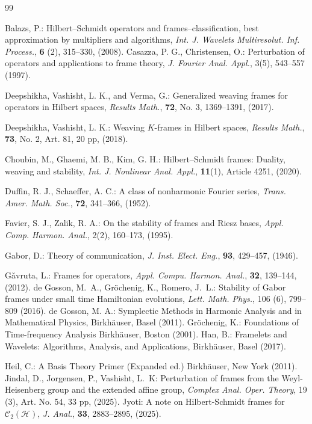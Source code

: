 \documentclass[reqno]{amsart}
\theoremstyle{plain}
\theoremstyle{remark}
\numberwithin{equation}{section}
\begin{document}
\begin{thebibliography}{99}\baselineskip10pt

Balazs, P.: Hilbert--Schmidt operators and frames--classification, best approximation by multipliers and algorithms,\emph{ Int. J. Wavelets Multiresolut. Inf. Process.}, \textbf{6} (2),  315--330, (2008).
Casazza, P. G.,  Christensen, O.: Perturbation of operators and applications to frame theory,  \emph{J. Fourier Anal. Appl.},  3(5),  543--557 (1997).


Deepshikha,  Vashisht, L. K., and Verma, G.:  Generalized weaving frames for  operators in Hilbert spaces, \emph{ Results  Math.}, \textbf{72}, No. 3,  1369--1391,  (2017).

Deepshikha, Vashisht, L. K.:  Weaving $K$-frames in Hilbert spaces, \emph{Results Math.},  \textbf{73},  No. 2, Art. 81, 20 pp, (2018).

Choubin, M., Ghaemi, M. B.,   Kim,  G. H.:  Hilbert--Schmidt frames: Duality, weaving and stability, \emph{Int. J. Nonlinear Anal.  Appl.},  \textbf{11}(1), Article 4251, (2020).

Duffin,  R. J.,  Schaeffer, A. C.: A class of nonharmonic Fourier series,  \emph{Trans. Amer. Math. Soc.}, \textbf{72}, 341--366,  (1952).


Favier, S. J.,  Zalik, R. A.: On the stability of frames and Riesz bases, \emph{Appl. Comp. Harmon. Anal.},   2(2),  160--173, (1995).

Gabor, D.: Theory of communication, \emph{ J. Inst. Elect. Eng.}, \textbf{93}, 429--457, (1946).


 G\v{a}vruta, L.:  Frames for operators,  \emph{ Appl. Compu. Harmon. Anal.},  \textbf{32}, 139--144, (2012).
	 de Gosson, M.~A., Gr\"{o}chenig, K., Romero, J.~L.: Stability of Gabor frames under small time Hamiltonian evolutions, \emph{Lett. Math. Phys.},  106 (6), 799--809 (2016).
de Gosson, M. A.: Symplectic Methods in Harmonic Analysis and in Mathematical Physics, Birkh\"auser, Basel (2011).
Gr\"{o}chenig, K.: Foundations of Time-frequency Analysis  Birkh\"{a}user, Boston (2001).
 Han, B.: Framelets and Wavelets: Algorithms, Analysis, and Applications,  Birkh\"auser,  Basel (2017).

Heil, C.: A Basis Theory Primer (Expanded ed.) Birkh\"{a}user,  New York (2011).
Jindal, D., Jorgensen, P.,   Vashisht,  L.~K: Perturbation of frames from the Weyl-Heisenberg group and the extended affine group, \emph{ Complex Anal. Oper. Theory},  19 (3),  Art. No.  54,  33 pp, (2025).
Jyoti: A note on Hilbert-Schmidt frames for $\mathcal{C}_2(\mathcal{H})$, \emph{J. Anal.}, \textbf{33}, 2883--2895, (2025).


\end{thebibliography}
\end{document}

